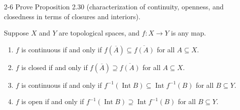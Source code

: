 \begin{problem}{2-6}\label{problem:2-6}
Prove Proposition 2.30 (characterization of continuity, openness, and closedness in terms of closures and interiors).

Suppose $X$ and $Y$ are topological spaces, and $f: X\to Y$ is any map.
\begin{enumerate}[label={(\alph*)}]
	\item $f$ is continuous if and only if $f(\overline{A}) \subseteq \overline{f(A)}$ for all $A\subseteq X$.
	\item $f$ is closed if and only if $f(\overline{A})\supseteq \overline{f(A)}$ for all $A\subseteq X$.
	\item $f$ is continuous if and only if $f^{-1}(\operatorname{Int}B) \subseteq \operatorname{Int} f^{-1}(B)$ for all $B\subseteq Y$.
	\item $f$ is open if and only if $f^{-1}(\operatorname{Int} B) \supseteq \operatorname{Int} f^{-1}(B)$ for all $B\subseteq Y$.
\end{enumerate}
\end{problem}

